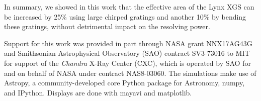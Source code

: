 \documentclass[]{spie}  %
\begin{document}
In summary, we showed in this work that the effective area of the Lynx XGS can be increased by 25\% using large chirped gratings and another 10\% by bending these gratings, without detrimental impact on the resolving power. 


\acknowledgments %
Support
for this work was provided in part through NASA grant NNX17AG43G and
Smithsonian Astrophysical Observatory (SAO) contract SV3-73016 to MIT
for support of the {\em Chandra} X-Ray Center (CXC), which is operated
by SAO for and on behalf of NASA under contract NAS8-03060.  The
simulations make use of Astropy, a community-developed core Python
package for Astronomy\cite{astropy1,astropy2}, numpy\cite{numpy}, and
IPython\cite{IPython}. Displays are done with mayavi\cite{mayavi} and
matplotlib\cite{matplotlib}.


\end{document}
